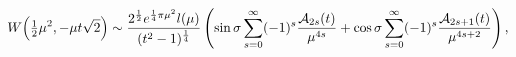 \[\mathop{W\/}\nolimits\!\left(\tfrac{1}{2}\mu^{2},-\mu t\sqrt{2}\right)\sim%
\frac{2^{\frac{1}{2}}e^{\frac{1}{4}\pi\mu^{2}}l(\mu)}{(t^{2}-1)^{\frac{1}{4}}}%
\left(\mathop{\sin\/}\nolimits\sigma\sum_{s=0}^{\infty}(-1)^{s}\frac{{\cal{A}}%
_{2s}(t)}{\mu^{4s}}+\mathop{\cos\/}\nolimits\sigma\sum_{s=0}^{\infty}(-1)^{s}%
\frac{{\cal{A}}_{2s+1}(t)}{\mu^{4s+2}}\right),\]